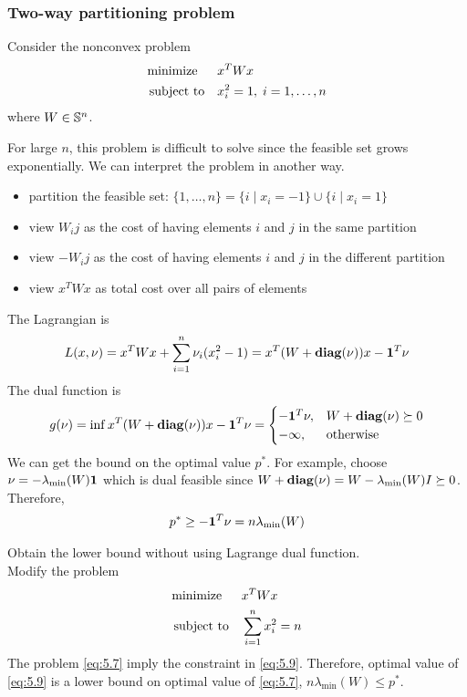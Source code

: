 \subsubsection{Two-way partitioning problem}
Consider the nonconvex problem
\begin{align}
  \text{minimize\;\;}\quad& x^TWx\nonumber\\
  \text{subject to}  \quad& x_i^2=1,\;i=1,\dots,n\label{eq:5.7}
\end{align}
where $W\in\mathbb{S}^n$.\par
For large $n$, this problem is difficult to solve since the feasible set grows exponentially.
We can interpret the problem in another way.
\begin{itemize}
  \item partition the feasible set: $\{1,\dots,n\}=\{i\mid x_i=-1\}\cup\{i\mid x_i=1\}$
  \item view $W_ij$ as the cost of having elements $i$ and $j$ in the same partition
  \item view $-W_ij$ as the cost of having elements $i$ and $j$ in the different partition
  \item view $x^TWx$ as total cost over all pairs of elements
\end{itemize}
The Lagrangian is
\begin{align*}
  L(x,\nu)=x^TWx+\sum_{i=1}^n\nu_i(x_i^2-1)=x^T(W+\mathop{\bf diag}(\nu))x-\mathbf 1^T\nu
\end{align*}
The dual function is
\begin{align*}
  g(\nu)=\inf x^T(W+\mathop{\bf diag}(\nu))x-\mathbf 1^T\nu=
    \begin{cases}
      -\mathbf 1^T\nu, &W+\mathop{\bf diag}(\nu)\succeq 0\\
      -\infty,     &\text{otherwise}
    \end{cases}
\end{align*}
We can get the bound on the optimal value $p^\ast$.
For example, choose $\nu=-\lambda_{\min}(W)\mathbf 1$ which is dual feasible since $W+\mathop{\bf diag}(\nu)=W-\lambda_{\min}(W)I\succeq 0$.
Therefore,
\begin{align}
  p^\ast\ge -\mathbf 1^T\nu=n\lambda_{\min}(W)\label{eq:5.8}
\end{align}
\begin{remark}
  Obtain the lower bound without using Lagrange dual function.\\
  Modify the problem
  \begin{align}
    \text{minimize\;\;}\quad& x^TWx\nonumber\\
    \text{subject to}  \quad& \sum_{i=1}^nx_i^2=n\label{eq:5.9}
  \end{align}
  The problem \eqref{eq:5.7} imply the constraint in \eqref{eq:5.9}.
  Therefore, optimal value of \eqref{eq:5.9} is a lower bound on optimal value of \eqref{eq:5.7}, \ie $n\lambda_{\min}(W)\le p^\ast$.
\end{remark}

